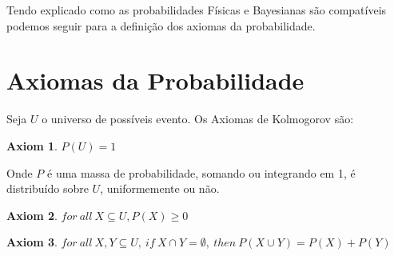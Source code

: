Tendo explicado como as probabilidades Físicas e Bayesianas são compatíveis podemos seguir para a definição dos axiomas da probabilidade. 

\section{Axiomas da Probabilidade}
Seja $U$ o universo de possíveis evento. Os Axiomas de Kolmogorov \cite{kolmogorov33} são:

\newtheorem{kolg1}{Axiom}[chapter]
\newtheorem{kolg2}[kolg1]{Axiom}
\newtheorem{kolg3}[kolg1]{Axiom}
\begin{kolg1}
	$P(U) = 1$
\end{kolg1}

Onde $P$ é uma massa de probabilidade, somando ou integrando em 1, é distribuído sobre $U$, uniformemente ou não. 

\begin{kolg2}
	$for\ all\ X \subseteq U, P(X) \ge 0$
\end{kolg2}


\begin{kolg3}
	$for\ all\ X, Y \subseteq U,\ if\ X \cap Y = \emptyset,\ then\ P(X \cup Y) = P(X) + P(Y)$
\end{kolg3}
